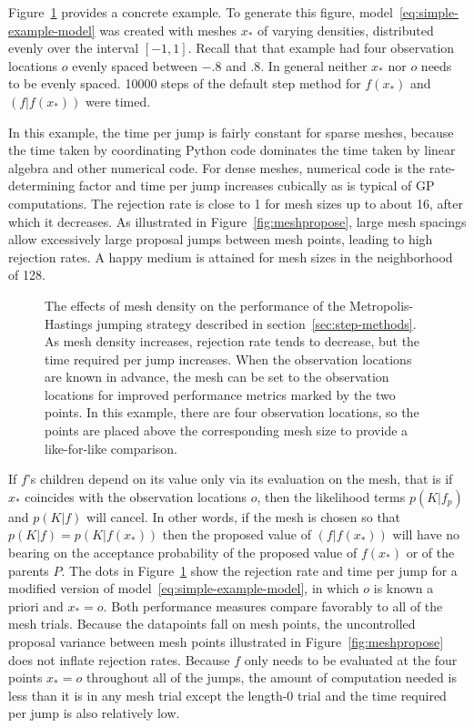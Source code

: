 \documentclass[article]{jss}
\begin{document}
Figure~\ref{fig:meshchoice} provides a concrete example. To generate this figure, model~\ref{eq:simple-example-model} was created with meshes $x_*$ of varying densities, distributed evenly over the interval $[-1,1]$. Recall that that example had four observation locations $o$ evenly spaced between $-.8$ and $.8$. In general neither $x_*$ nor $o$ needs to be evenly spaced. 10000 steps of the default step method for $f(x_*)$ and $(f|f(x_*))$ were timed. 

In this example, the time per jump is fairly constant for sparse meshes, because the time taken by coordinating Python code dominates the time taken by linear algebra and other numerical code. For dense meshes, numerical code is the rate-determining factor and time per jump increases cubically as is typical of GP computations. The rejection rate is close to 1 for mesh sizes up to about 16, after which it decreases. As illustrated in Figure~\ref{fig:meshpropose}, large mesh spacings allow excessively large proposal jumps between mesh points, leading to high rejection rates. A happy medium is attained for mesh sizes in the neighborhood of 128.

\begin{figure}
    \centering
    \caption{The effects of mesh density on the performance of the Metropolis-Hastings jumping strategy described in section~\ref{sec:step-methods}. As mesh density increases, rejection rate tends to decrease, but the time required per jump increases. When the observation locations are known in advance, the mesh can be set to the observation locations for improved performance metrics marked by the two points. In this example, there are four observation locations, so the points are placed above the corresponding mesh size to provide a like-for-like comparison.}
    \label{fig:meshchoice}
\end{figure}

If $f$'s children depend on its value only via its evaluation on the mesh, that is if $x_*$ coincides with the observation locations $o$, then the likelihood terms $p(K|f_p)$ and $p(K|f)$ will cancel. In other words, if the mesh is chosen so that $p(K|f)=p(K|f(x_*))$ then the proposed value of $(f|f(x_*))$ will have no bearing on the acceptance probability of the proposed value of $f(x_*)$ or of the parents $P$. The dots in Figure~\ref{fig:meshchoice} show the rejection rate and time per jump for a modified version of model~\ref{eq:simple-example-model}, in which $o$ is known a priori and $x_*=o$. Both performance measures compare favorably to all of the mesh trials. Because the datapoints fall on mesh points, the uncontrolled proposal variance between mesh points illustrated in Figure~\ref{fig:meshpropose} does not inflate rejection rates. Because $f$ only needs to be evaluated at the four points $x_*=o$ throughout all of the jumps, the amount of computation needed is less than it is in any mesh trial except the length-0 trial and the time required per jump is also relatively low.
\end{document}
